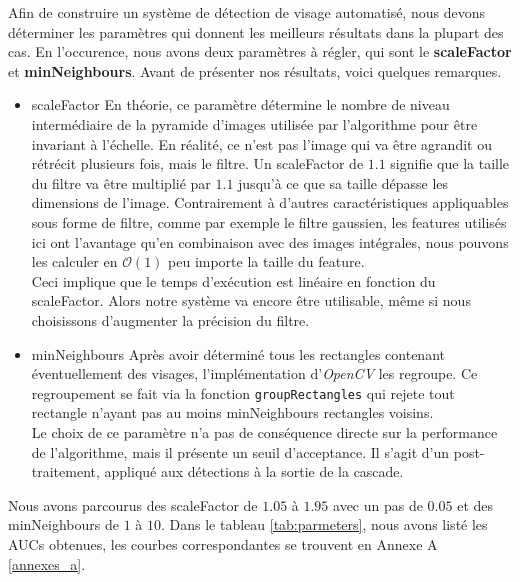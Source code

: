 \documentclass[a4paper,11pt]{article}
\begin{document}
        Afin de construire un système de détection de visage automatisé, nous devons déterminer les paramètres qui donnent les meilleurs résultats dans la plupart des cas.
        En l'occurence, nous avons deux paramètres à régler, qui sont le {\bf scaleFactor} et {\bf minNeighbours}.
        Avant de présenter nos résultats, voici quelques remarques.
        \begin{itemize}
            \item scaleFactor
                En théorie, ce paramètre détermine le nombre de niveau intermédiaire de la pyramide d'images utilisée par l'algorithme pour être invariant à l'échelle.
                En réalité, ce n'est pas l'image qui va être agrandit ou rétrécit plusieurs fois, mais le filtre.
                Un scaleFactor de $1.1$ signifie que la taille du filtre va être multiplié par $1.1$ jusqu'à ce que sa taille dépasse les dimensions de l'image.
                Contrairement à d'autres caractéristiques appliquables sous forme de filtre, comme par exemple le filtre gaussien, les features utilisés ici ont l'avantage qu'en combinaison avec des images intégrales, nous pouvons les calculer en $\mathcal{O}(1)$ peu importe la taille du feature.
                \\
                Ceci implique que le temps d'exécution est linéaire en fonction du scaleFactor.
                Alors notre système va encore être utilisable, même si nous choisissons d'augmenter la précision du filtre.
            \item minNeighbours
                Après avoir déterminé tous les rectangles contenant éventuellement des visages, l'implémentation d'{\it OpenCV} les regroupe.
                Ce regroupement se fait via la fonction \verb!groupRectangles! qui rejete tout rectangle n'ayant pas au moins minNeighbours rectangles voisins.
                \\
                Le choix de ce paramètre n'a pas de conséquence directe sur la performance de l'algorithme, mais il présente un seuil d'acceptance.
                Il s'agit d'un post-traitement, appliqué aux détections à la sortie de la cascade.
        \end{itemize}

        Nous avons parcourus des scaleFactor de $1.05$ à $1.95$ avec un pas de $0.05$ et des minNeighbours de $1$ à $10$.
        Dans le tableau \ref{tab:parmeters}, nous avons listé les AUCs obtenues, les courbes correspondantes se trouvent en Annexe A \ref{annexes_a}.
\end{document}
